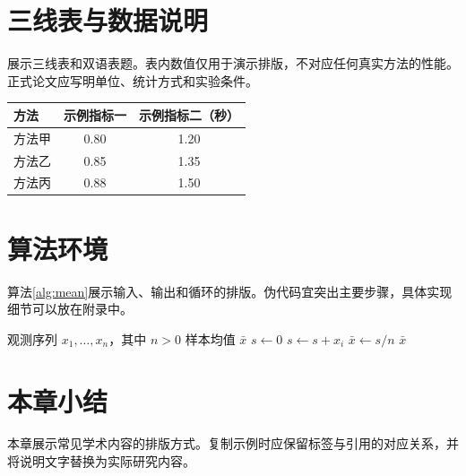 \section{三线表与数据说明}
展示三线表和双语表题。表内数值仅用于演示排版，不对应任何真实方法的性能。正式论文应写明单位、统计方式和实验条件。
\begin{table}[htbp]
\begin{tabular}{lcc}
\toprule
方法 & 示例指标一 & 示例指标二（秒）\\
\midrule
方法甲 & 0.80 & 1.20\\
方法乙 & 0.85 & 1.35\\
方法丙 & 0.88 & 1.50\\
\bottomrule
\end{tabular}
\end{table}
\section{算法环境}
算法\ref{alg:mean}展示输入、输出和循环的排版。伪代码宜突出主要步骤，具体实现细节可以放在附录中。
\begin{algorithm}[htbp]
\caption{样本均值计算示例}\label{alg:mean}
\begin{algorithmic}[1]
\REQUIRE 观测序列 $x_1,\ldots,x_n$，其中 $n>0$
\ENSURE 样本均值 $\bar{x}$
\STATE $s\leftarrow 0$
\STATE $s\leftarrow s+x_i$
\ENDFOR
\STATE $\bar{x}\leftarrow s/n$
\RETURN $\bar{x}$
\end{algorithmic}
\end{algorithm}
\section{本章小结}
本章展示常见学术内容的排版方式。复制示例时应保留标签与引用的对应关系，并将说明文字替换为实际研究内容。
